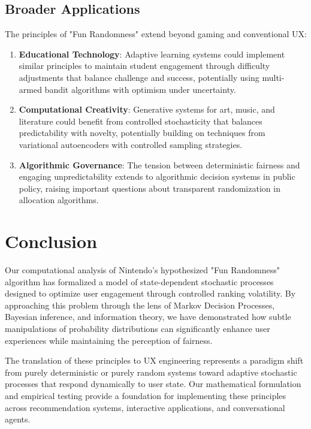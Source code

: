 \documentclass{article}
\begin{document}
\subsection{Broader Applications}

The principles of "Fun Randomness" extend beyond gaming and conventional UX:

\begin{enumerate}
    \item \textbf{Educational Technology}: Adaptive learning systems could implement similar principles to maintain student engagement through difficulty adjustments that balance challenge and success, potentially using multi-armed bandit algorithms with optimism under uncertainty.
    
    \item \textbf{Computational Creativity}: Generative systems for art, music, and literature could benefit from controlled stochasticity that balances predictability with novelty, potentially building on techniques from variational autoencoders with controlled sampling strategies.
    
    \item \textbf{Algorithmic Governance}: The tension between deterministic fairness and engaging unpredictability extends to algorithmic decision systems in public policy, raising important questions about transparent randomization in allocation algorithms.
\end{enumerate}

\section{Conclusion}

Our computational analysis of Nintendo's hypothesized "Fun Randomness" algorithm has formalized a model of state-dependent stochastic processes designed to optimize user engagement through controlled ranking volatility. By approaching this problem through the lens of Markov Decision Processes, Bayesian inference, and information theory, we have demonstrated how subtle manipulations of probability distributions can significantly enhance user experiences while maintaining the perception of fairness.

The translation of these principles to UX engineering represents a paradigm shift from purely deterministic or purely random systems toward adaptive stochastic processes that respond dynamically to user state. Our mathematical formulation and empirical testing provide a foundation for implementing these principles across recommendation systems, interactive applications, and conversational agents.
\end{document}
